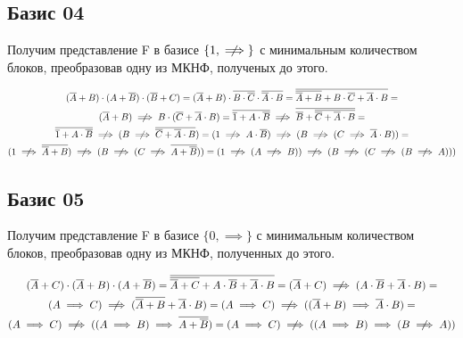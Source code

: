 \documentclass[a4paper,10pt]{article} %
\begin{document}
	\subsection{Базис 04}
	Получим представление F в базисе $\{1, \centernot\implies\}$ с минимальным количеством блоков, преобразовав одну из МКНФ, полученых до этого.
	
	\begin{multline*}
		(\overline{A} + B) \cdot (A + \overline{B}) \cdot (\overline{B} + C) = 
		(\overline{A} + B) \cdot \overline{B \cdot \overline{C}} 
		\cdot \overline{\overline{A} \cdot B} =
		\overline{\overline{\overline{A} + B} + B \cdot \overline{C} 
		+ \overline{A} \cdot B} = \\
		(\overline{A} + B) \centernot\implies 
		B \cdot (\overline{C} + \overline{A} \cdot B) = 
		\overline{\overline{1} + A \cdot \overline{B}} \centernot\implies
		\overline{\overline{B} + \overline{\overline{C} + \overline{A} \cdot B}} = \\
		\overline{\overline{1} + A \cdot \overline{B}} \centernot\implies
		(B \centernot\implies \overline{\overline{C} + \overline{A} \cdot B}) = 
		(1 \centernot\implies A \cdot \overline{B}) \centernot\implies 
		(B \centernot\implies (C \centernot\implies \overline{A} \cdot B)) = \\
		(1 \centernot\implies \overline{\overline{A} + B}) \centernot\implies 
		(B \centernot\implies (C \centernot\implies \overline{A + \overline{B}})) =
		(1 \centernot\implies (A \centernot\implies B)) \centernot\implies
		(B \centernot\implies (C \centernot\implies (B \centernot\implies A)))
	\end{multline*}
	
	\subsection{Базис 05}
	Получим представление F в базисе $\{0, \implies\}$ с минимальным количеством блоков, преобразовав одну из МКНФ, полученных до этого.
	
	\begin{multline*}
	(\overline{A} + C) \cdot (\overline{A} + B) \cdot (A + \overline{B}) = 
	\overline{\overline{\overline{A} + C} + A \cdot \overline{B} + \overline{A} \cdot B} =
	(\overline{A} + C) \centernot\implies
	(A \cdot \overline{B} + \overline{A} \cdot B) = \\
	(A \implies C) \centernot\implies 
	(\overline{\overline{A} + B} + \overline{A} \cdot B) = 
	(A \implies C) \centernot\implies 
	((\overline{A} + B) \implies \overline{A} \cdot B) = \\
	(A \implies C) \centernot\implies 
	((A \implies B) \implies \overline{A + \overline{B}}) = 
	(A \implies C) \centernot\implies 
	((A \implies B) \implies (B \centernot\implies A))
	\end{multline*}
	
\end{document}
